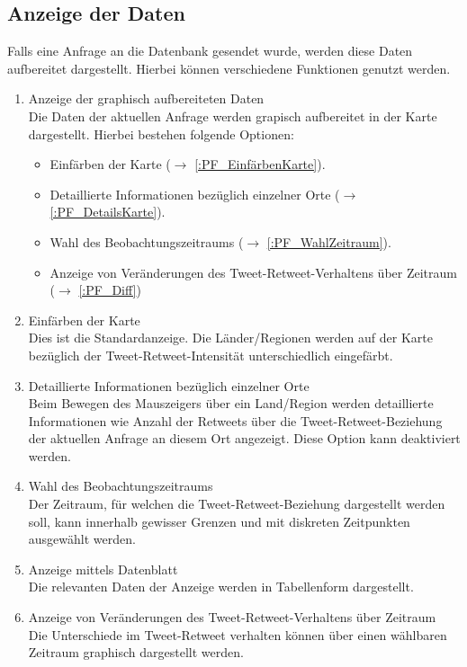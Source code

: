\subsection{Anzeige der Daten}	
Falls eine Anfrage an die Datenbank gesendet wurde, werden diese Daten aufbereitet dargestellt. Hierbei können verschiedene Funktionen genutzt werden.
\begin{enumerate}[ align=left, label={\textbf{\textbackslash F20\arabic*0\textbackslash}} ]	
	\item Anzeige der graphisch aufbereiteten Daten \\
	Die Daten der aktuellen Anfrage werden grapisch aufbereitet in der Karte dargestellt.
	Hierbei bestehen folgende Optionen:
	\begin{itemize}
		\item Einfärben der Karte ($\rightarrow$ \ref{:PF_EinfärbenKarte}).
		\item Detaillierte Informationen bezüglich einzelner Orte ($\rightarrow$ \ref{:PF_DetailsKarte}).
		\item Wahl des Beobachtungszeitraums ($\rightarrow$ \ref{:PF_WahlZeitraum}).
		\item Anzeige von Veränderungen des Tweet-Retweet-Verhaltens über Zeitraum ($\rightarrow$ \ref{:PF_Diff})
	\end{itemize}
	
	\item Einfärben der Karte \label{:PF_EinfärbenKarte} \\
	Dies ist die Standardanzeige. Die Länder/Regionen werden auf der Karte bezüglich der Tweet-Retweet-Intensität unterschiedlich eingefärbt.
	\item Detaillierte Informationen bezüglich einzelner Orte \label{:PF_DetailsKarte} \\
	Beim Bewegen des Mauszeigers über ein Land/Region werden detaillierte Informationen wie Anzahl der Retweets über die Tweet-Retweet-Beziehung der aktuellen Anfrage an diesem Ort angezeigt. Diese Option kann deaktiviert werden.
	\item Wahl des Beobachtungszeitraums \label{:PF_WahlZeitraum} \\
	Der Zeitraum, für welchen die Tweet-Retweet-Beziehung dargestellt werden soll, kann innerhalb gewisser Grenzen und mit diskreten Zeitpunkten ausgewählt werden.
	
	\item Anzeige mittels Datenblatt \label{:PF_AnzeigeDatenblatt} \\
	Die relevanten Daten der Anzeige werden in Tabellenform dargestellt.
	
	\item Anzeige von Veränderungen des Tweet-Retweet-Verhaltens über Zeitraum \label{:PF_Diff} \\
	Die Unterschiede im Tweet-Retweet verhalten können über einen wählbaren Zeitraum graphisch dargestellt werden.
\end{enumerate}

